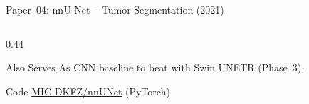 \documentclass[aspectratio=169,xcolor=dvipsnames]{beamer}
\begin{document}
\begin{frame}{Paper~04: nnU-Net -- Tumor Segmentation (2021)}
\begin{columns}
\begin{column}{0.44\textwidth}
            \vspace{0.2em}

            \begin{block}{\small Also Serves As}
                \small CNN baseline to beat with Swin UNETR (Phase~3).
            \end{block}

            \begin{exampleblock}{\scriptsize {} Code}
                \scriptsize \href{https://github.com/MIC-DKFZ/nnUNet}{MIC-DKFZ/nnUNet} (PyTorch)
            \end{exampleblock}
        \end{column}
    \end{columns}
\end{frame}

\end{document}
